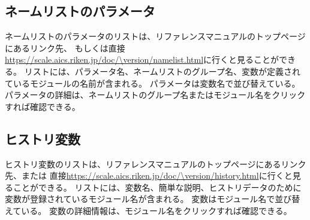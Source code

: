 \subsection{ネームリストのパラメータ}
ネームリストのパラメータのリストは、リファレンスマニュアルのトップページにあるリンク先、
もしくは直接\url{https://scale.aics.riken.jp/doc/\version/namelist.html}に行くと見ることができる。
リストには、パラメータ名、ネームリストのグループ名、変数が定義されているモジュールの名前が含まれる。
パラメータは変数名で並び替えている。
パラメータの詳細は、ネームリストのグループ名またはモジュール名をクリックすれば確認できる。


\subsection{ヒストリ変数}
ヒストリ変数のリストは、リファレンスマニュアルのトップページにあるリンク先、または
直接\url{https://scale.aics.riken.jp/doc/\version/history.html}に行くと見ることができる。
リストには、変数名、簡単な説明、ヒストリデータのために変数が登録されているモジュール名が含まれる。
変数はモジュール名で並び替えている。
変数の詳細情報は、モジュール名をクリックすれば確認できる。
